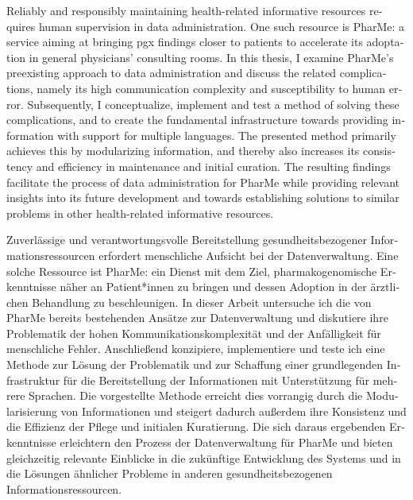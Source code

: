 \null\vfil
\begin{otherlanguage}{english}
\begin{center}\textsf{\textbf{\abstractname}}\end{center}

    \noindent Reliably and responsibly maintaining health-related informative
    resources requires human supervision in data administration. One such
    resource is PharMe: a service aiming at bringing \gls{pgx} findings closer
    to patients to accelerate its adoptation in general physicians' consulting
    rooms. In this thesis, I examine PharMe's preexisting approach to data
    administration and discuss the related complications, namely its high
    communication complexity and susceptibility to human error. Subsequently, I
    conceptualize, implement and test a method of solving these complications,
    and to create the fundamental infrastructure towards providing information
    with support for multiple languages. The presented method primarily
    achieves this by modularizing information, and thereby also increases its
    consistency and efficiency in maintenance and initial curation. The
    resulting findings facilitate the process of data administration for PharMe
    while providing relevant insights into its future development and towards
    establishing solutions to similar problems in other health-related
    informative resources.

\end{otherlanguage}
\vfil\null

\null\vfil
\begin{otherlanguage}{ngerman}
\begin{center}\textsf{\textbf{\abstractname}}\end{center}

    \noindent Zuverlässige und verantwortungsvolle Bereitstellung
    gesundheitsbezogener Informationsressourcen erfordert menschliche Aufsicht
    bei der Datenverwaltung. Eine solche Ressource ist PharMe: ein Dienst mit
    dem Ziel, pharmakogenomische Erkenntnisse näher an Patient*innen zu bringen
    und dessen Adoption in der ärztlichen Behandlung zu beschleunigen.  In
    dieser Arbeit untersuche ich die von PharMe bereits bestehenden Ansätze zur
    Datenverwaltung und diskutiere ihre Problematik der hohen
    Kommunikationskomplexität und der Anfälligkeit für menschliche Fehler.
    Anschließend konzipiere, implementiere und teste ich eine Methode zur
    Lösung der Problematik und zur Schaffung einer grundlegenden Infrastruktur
    für die Bereitstellung der Informationen mit Unterstützung für mehrere
    Sprachen. Die vorgestellte Methode erreicht dies vorrangig durch die
    Modularisierung von Informationen und steigert dadurch außerdem ihre
    Konsistenz und die Effizienz der Pflege und initialen Kuratierung. Die sich
    daraus ergebenden Erkenntnisse erleichtern den Prozess der Datenverwaltung
    für PharMe und bieten gleichzeitig relevante Einblicke in die zukünftige
    Entwicklung des Systems und in die Lösungen ähnlicher Probleme in anderen
    gesundheitsbezogenen Informationsressourcen.

\end{otherlanguage}
\vfil\null

